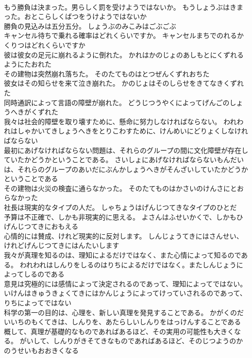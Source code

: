 \documentclass[8pt]{extreport}
\begin{document}
\begin{CJK}{UTF8}{min}
\\	もう勝負は決まった。男らしく罰を受けようではないか。	もうしょうぶはきまった。おとこらしくばつをうけようではないか 
\\	勝負の見込みは五分五分。	しょうぶのみこみはごぶごぶ 
\\	キャンセル待ちで乗れる確率はどれくらいですか。	キャンセルまちでのれるかくりつはどれくらいですか 
\\	彼は彼女の足元に崩れるように倒れた。	かれはかのじょのあしもとにくずれるようにたおれた 
\\	その建物は突然崩れ落ちた。	そのたてものはとつぜんくずれおちた 
\\	彼女はその知らせを来て泣き崩れた。	かのじょはそのしらせをきてなきくずれた 
\\	同時通訳によって言語の障壁が崩れた。	どうじつうやくによってげんごのしょうへきがくずれた 
\\	我々は社会的障壁を取り壊すために、懸命に努力しなければならない。	われわれはしゃかいてきしょうへきをとりこわすために、けんめいにどりょくしなければならない 
\\	最初にあげなければならない問題は、それらのグループの間に文化障壁が存在していたかどうかということである。	さいしょにあげなければならないもんだいは、それらのグループのあいだにぶんかしょうへきがそんざいしていたかどうかということである 
\\	その建物は火災の検査に通らなかった。	そのたてものはかさいのけんさにとおらなかった 
\\	社長は現実的なタイプの人だ。	しゃちょうはげんじつてきなタイプのひとだ 
\\	予算は不正確で、しかも非現実的に思える。	よさんはふせいかくで、しかもひげんじつてきにおもえる 
\\	心情的には賛成、けれど現実的に反対します。	しんじょうてきにはさんせい、けれどげんじつてきにはんたいします 
\\	我々が真理を知るのは、理知によるだけではなく、また心情によって知るのである。	われわれはしんりをしるのはりちによるだけではなく。またしんじょうによってしるのである 
\\	意見は究極的には感情によって決定されるのであって、理知によってではない。	いけんはきゅうきょくてきにはかんじょうによってけっていされるのであって、りちによってではない 
\\	科学の第一の目的は、心理を、新しい真理を発見することである。	かがくのだいいちのもくてきは、しんりを、あたらしいしんりをはっけんすることである 
\\	概して、真理が基礎的なものであればあるほど、その実用の可能性も大きくなる。	がいして、しんりがきそてきなものであればあるほど、そのじつようのかのうせいもおおきくなる 

\end{CJK}
\end{document}
